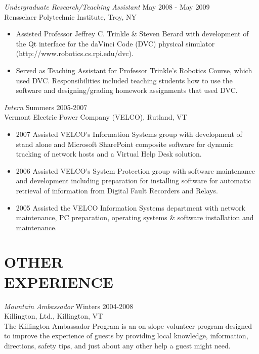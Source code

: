 \documentclass[line,margin]{res}
\begin{document}
\begin{resume}
  {\sl Undergraduate Research/Teaching Assistant} \hfill May 2008 - May 2009 \\
  Rensselaer Polytechnic Institute, Troy, NY\\
  \begin{itemize}  \itemsep -2pt %
  \item Assisted Professor Jeffrey C. Trinkle \& Steven Berard with development of the Qt interface for the daVinci Code (DVC) physical simulator\\ (http://www.robotics.cs.rpi.edu/dvc).
  \item Served as Teaching Assistant for Professor Trinkle's Robotics Course, which used DVC.
    Responsibilities included teaching students how to use the software and designing/grading homework assignments that used DVC.
  \end{itemize}

  {\sl Intern} \hfill            Summers 2005-2007 \\
  Vermont Electric Power Company (VELCO), Rutland, VT \\
  \begin{itemize}  \itemsep -2pt %
  \item{2007} Assisted VELCO's Information Systems group with development of stand alone and Microsoft SharePoint composite software for dynamic tracking of network hosts and a Virtual Help Desk solution.
  \item{2006}
    Assisted VELCO's System Protection group with software maintenance and development including preparation for installing software for automatic retrieval of information from Digital Fault Recorders and Relays.
  \item{2005}
    Assisted the VELCO Information Systems department with network maintenance, PC preparation, operating systems \& software installation and maintenance.
  \end{itemize} 

  \section{OTHER\\ EXPERIENCE}             
  {\it Mountain Ambassador} \hfill Winters 2004-2008\\
  Killington, Ltd., Killington, VT \\
  The Killington Ambassador Program is an on-slope volunteer program designed to improve the experience of guests by providing local knowledge, information, directions, safety tips, and just about any other help a guest might need.


\end{resume}
\end{document}
